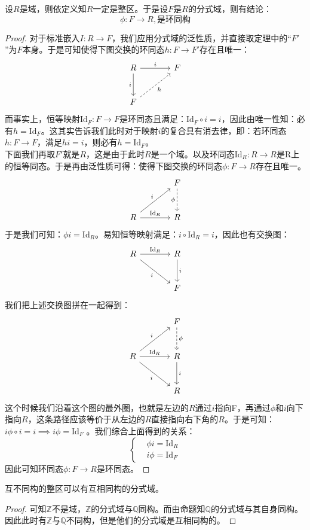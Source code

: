 设$R$是域，则依定义知$R$一定是整区。于是设$F$是$R$的分式域，则有结论：
\[
\phi\colon F\to R,\text{是环同构}
\]
\begin{proof}
\indent 对于标准嵌入$I\colon R\to F$，我们应用分式域的泛性质，并直接取定理中的“$F'$”为$F$本身。于是可知使得下图交换的环同态$h\colon F\to F'$存在且唯一：
\[
\begin{tikzcd}[row sep=large, column sep=large]
R \arrow[r, "i"] \arrow[d, "i"'] & F \\
F \arrow[ru, dashed, "h"'] &
\end{tikzcd}
\]
\indent 而事实上，恒等映射$\mathrm{Id}_F\colon F\to F$是环同态且满足：$\mathrm{Id}_F\circ i=i$，因此由唯一性知：必有$h=\mathrm{Id}_F$。这其实告诉我们此时对于映射$i$的复合具有消去律，即：若环同态$h\colon F\to F$，满足$hi=i$，则必有$h=\mathrm{Id}_F$。\\
\indent 下面我们再取$F'$就是$R$，这是由于此时$R$是一个域。以及环同态$\mathrm{Id}_R\colon R\to R $是R上的恒等同态。于是再由泛性质可得：使得下图交换的环同态$\phi\colon F\to R$存在且唯一。
\[
\begin{tikzcd}[row sep =large, column sep =large]
 & F\arrow[d,dashed,"\phi"']\\
R\arrow[ru,"i"]\arrow[r,"\mathrm{Id}_R"] & R
\end{tikzcd}
\]
\indent 于是我们可知：$\phi i=\mathrm{Id}_R$。易知恒等映射满足：$i\circ \mathrm{Id}_R=i$，因此也有交换图：
\[
\begin{tikzcd}[row sep = large, column sep = large]
R\arrow[r,"\mathrm{Id}_R"]\arrow[rd,"i"'] & R\arrow[d,"i"]\\
 & F
\end{tikzcd}
\]
我们把上述交换图拼在一起得到：
\[
\begin{tikzcd}[row sep =large, column sep =large]
 & F\arrow[d,dashed,"\phi"]\\
R\arrow[ru,"i"]\arrow[r,"\mathrm{Id}_R"]\arrow[rd,"i"'] & R\arrow[d,"i"]\\
 & R
\end{tikzcd}
\]
\indent 这个时候我们沿着这个图的最外圈，也就是左边的$R$通过$i$指向F，再通过$\phi$和$i$向下指向$R$，这条路径应该等价于从左边的$R$直接指向右下角的$R$。于是可知：$i\phi\circ i=i\implies i\phi=\mathrm{Id}_F$ 。我们综合上面得到的关系：
\[
\left\{
\begin{aligned}
&\phi i=\mathrm{Id}_R\\
&i \phi=\mathrm{Id}_F
\end{aligned}\right. 
\]
因此可知环同态$\phi\colon F\to R$是环同态。
\end{proof}
互不同构的整区可以有互相同构的分式域。
\begin{proof}
可知$\mathbb{Z}$不是域，$\mathbb{Z}$的分式域与$\mathbb{Q}$同构。而由命题知$\mathbb{Q}$的分式域与其自身同构。因此此时有$\mathbb{Z}$与$\mathbb{Q}$不同构，但是他们的分式域是互相同构的。
\end{proof}

